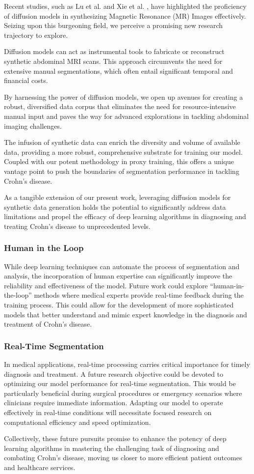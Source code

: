 Recent studies, such as Lu et al. \cite{lu2023minddiffuser} and Xie et al. \cite{xie2023synthesizing}, have highlighted the proficiency of diffusion models in synthesizing Magnetic Resonance (MR) Images effectively. Seizing upon this burgeoning field, we perceive a promising new research trajectory to explore.

Diffusion models can act as instrumental tools to fabricate or reconstruct synthetic abdominal MRI scans. This approach circumvents the need for extensive manual segmentations, which often entail significant temporal and financial costs.

By harnessing the power of diffusion models, we open up avenues for creating a robust, diversified data corpus that eliminates the need for resource-intensive manual input and paves the way for advanced explorations in tackling abdominal imaging challenges.

The infusion of synthetic data can enrich the diversity and volume of available data, providing a more robust, comprehensive substrate for training our model. Coupled with our potent methodology in proxy training, this offers a unique vantage point to push the boundaries of segmentation performance in tackling Crohn's disease.

As a tangible extension of our present work, leveraging diffusion models for synthetic data generation holds the potential to significantly address data limitations and propel the efficacy of deep learning algorithms in diagnosing and treating Crohn's disease to unprecedented levels.

\subsubsection*{Human in the Loop}

While deep learning techniques can automate the process of segmentation and analysis, the incorporation of human expertise can significantly improve the reliability and effectiveness of the model. Future work could explore “human-in-the-loop” methods where medical experts provide real-time feedback during the training process. This could allow for the development of more sophisticated models that better understand and mimic expert knowledge in the diagnosis and treatment of Crohn's disease.

\subsubsection*{Real-Time Segmentation}
In medical applications, real-time processing carries critical importance for timely diagnosis and treatment. A future research objective could be devoted to optimizing our model performance for real-time segmentation. This would be particularly beneficial during surgical procedures or emergency scenarios where clinicians require immediate information. Adapting our model to operate effectively in real-time conditions will necessitate focused research on computational efficiency and speed optimization.

Collectively, these future pursuits promise to enhance the potency of deep learning algorithms in mastering the challenging task of diagnosing and combating Crohn's disease, moving us closer to more efficient patient outcomes and healthcare services.




